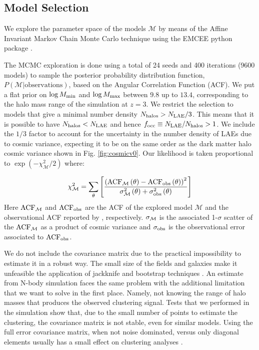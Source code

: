 \documentclass{emulateapj}
\newcommand{\mmax}{{\ifmmode{{M_{\rm max}}}\else{${M_{\rm max}}$}\fi}}
\newcommand{\focc}{{\ifmmode{{f_{\rm occ}}}\else{${f_{\rm occ}}$}\fi}}
\begin{document}
\subsection{Model Selection}
\label{subsec:explore}



We  explore the parameter space of the models
${\mathcal M}$ by  means of the Affine Invariant  Markov Chain Monte Carlo technique using
the EMCEE python package \citep[][and references therein]{emcee2013}. 


The MCMC exploration is done using a total of 24 seeds and 400
iterations (9600 models) to sample the posterior  probability distribution function, $P(\mathcal{M}|\mathrm{observations})$, based on the Angular
Correlation Function (ACF). We put a flat prior on $\log M_{\rm min}$ and $\log \mmax$ between
$9.8$ up to $13.4$, corresponding to the halo mass range of
the simulation at $z=3$.
We restrict the selection to models that give a minimal number density
$N_{\rm{halos}}>N_{\rm LAE}/3$.
This means that it is possible to have $N_{\rm{halos}} < N_{\rm LAE}$
and hence $\focc\equiv N_{\rm{LAE}}/N_{\rm{halos}}>1$.
We include the $1/3$ factor to account for the uncertainty in the number
density of LAEs due to cosmic variance, expecting it to be on the
same order as the dark matter halo cosmic variance shown in
Fig. \ref{fig:cosmicv0}.   Our likelihood is taken proportional to
$ \exp(-\chi_{\mathcal  M}^2/2)$  where:

\begin{equation}
\chi_{\mathcal M}^2=
\sum_{\theta}\left[\frac{\left( \rm{ACF}_{\mathcal
      M}\left(\theta\right) - \rm{ACF}_{\rm
      obs}\left(\theta\right)\right)^2}{ \sigma_{\rm \mathcal
      M}^{2}\left(\theta\right) + \sigma_{\rm
      obs}^{2}\left(\theta\right)}\right]
\end{equation}
%
Here  $\rm{ACF}_{\mathcal M}$ and  $\rm{ACF}_{\rm obs}$ are the ACF
of the explored model ${\mathcal M}$ and the observational ACF
reported by \citet{Bielby16}, respectively.
$\sigma_{\rm \mathcal M}$ is the associated 1-$\sigma$ scatter  of the
$\rm{ACF}_{\mathcal M}$ as a product of cosmic variance and
$\sigma_{\rm obs}$ is the observational error associated to
$\rm{ACF}_{\rm obs}$.

We do not include the covariance matrix due to the
practical impossibility to estimate it in a robust way.
The small size of the fields and galaxies make it
unfeasible the application of jackknife and bootstrap techniques \citep{2009MNRAS.396...19N}. 
An estimate from N-body simulation faces the same problem with the
additional limitation that we want to solve in the first place. 
Namely, not knowing the range of halo masses that produces the
observed clustering signal.  
Tests that we performed in the simulation show that, due to the small
number of points to estimate the clustering, the covariance matrix is
not stable, even for similar models. 
Using the full error covariance matrix, when not noise
dominated, versus only diagonal elements usually has a small effect
on clustering analyses \citep{2011ApJ...736...59Z}. 
\end{document}
